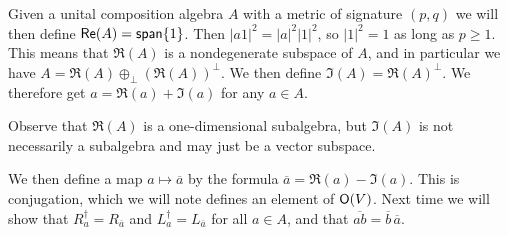 Given a unital composition algebra $A$ with a metric of signature $(p,q)$ we will then define $\textsf{Re}(A) = \operatorname{\textsf{span}}\{1\}$. Then $|a1|^2 = |a|^2 |1|^2$, so $|1|^2 = 1$ as long as $p\geq 1$. This means that $\Re(A)$ is a nondegenerate subspace of $A$, and in particular we have $A = \Re(A)\oplus_\perp (\Re(A))^\perp$. We then define $\Im(A) = \Re(A)^\perp$. We therefore get $a = \Re(a)+\Im(a)$ for any $a \in A$.

Observe that $\Re(A)$ is a one-dimensional subalgebra, but $\Im(A)$ is not necessarily a subalgebra and may just be a vector subspace.

We then define a map $a \mapsto \overline{a}$ by the formula $\overline{a}=\Re(a)-\Im(a)$. This is conjugation, which we will note defines an element of $\operatorname{\textsf{O}}(V)$. Next time we will show that $R_a^\dagger = R_{\overline{a}}$ and $L_a^\dagger = L_{\overline{a}}$ for all $a\in A$, and that $\overline{ab}=\overline{b}\,\overline{a}$.
